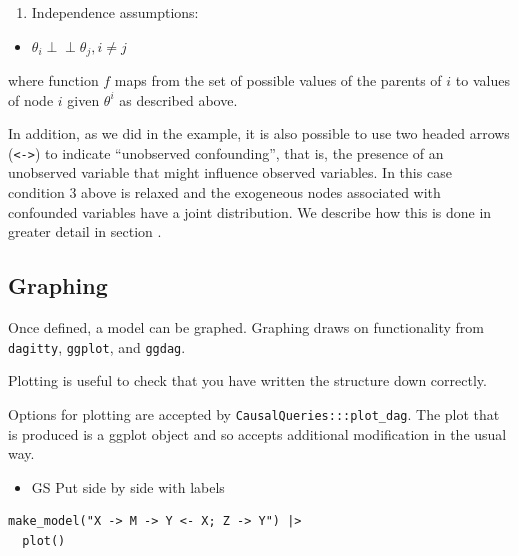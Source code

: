 \documentclass[
  article]{jss}
\providecommand{\tightlist}{%
  \setlength{\itemsep}{0pt}\setlength{\parskip}{0pt}}\usepackage{longtable,booktabs,array}
\begin{document}
\begin{enumerate}
\def\labelenumi{\arabic{enumi}.}
\setcounter{enumi}{2}
\tightlist
\item
  Independence assumptions:\\
\end{enumerate}

\begin{itemize}
\tightlist
\item
  \(\theta_i \perp\!\!\! \perp \theta_j, i\neq j\)
\end{itemize}

where function \(f\) maps from the set of possible values of the parents
of \(i\) to values of node \(i\) given \(\theta^i\) as described above.

In addition, as we did in the \citet{chickering1996clinician} example,
it is also possible to use two headed arrows
(\texttt{\textless{}-\textgreater{}}) to indicate ``unobserved
confounding'', that is, the presence of an unobserved variable that
might influence observed variables. In this case condition 3 above is
relaxed and the exogeneous nodes associated with confounded variables
have a joint distribution. We describe how this is done in greater
detail in section \citet{confounding}.

\hypertarget{graphing}{%
\subsection{Graphing}\label{graphing}}

Once defined, a model can be graphed. Graphing draws on functionality
from \texttt{dagitty}, \texttt{ggplot}, and \texttt{ggdag}.

Plotting is useful to check that you have written the structure down
correctly.

Options for plotting are accepted by \texttt{CausalQueries:::plot\_dag}.
The plot that is produced is a ggplot object and so accepts additional
modification in the usual way.

\begin{itemize}
\tightlist
\item
  GS Put side by side with labels
\end{itemize}

\begin{verbatim}
make_model("X -> M -> Y <- X; Z -> Y") |>
  plot()
\end{verbatim}
\end{document}
